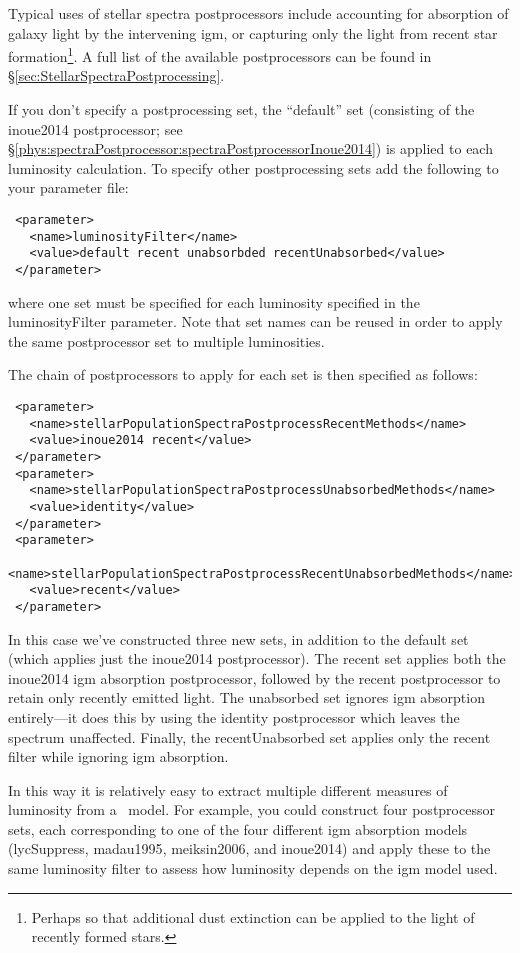 Typical uses of stellar spectra postprocessors include accounting for absorption of galaxy light by the intervening \gls{igm}, or capturing only the light from recent star formation\footnote{Perhaps so that additional dust extinction can be applied to the light of recently formed stars.}. A full list of the available postprocessors can be found in \S\ref{sec:StellarSpectraPostprocessing}.

If you don't specify a postprocessing set, the ``default'' set (consisting of the {\normalfont \ttfamily inoue2014} postprocessor; see \S\ref{phys:spectraPostprocessor:spectraPostprocessorInoue2014}) is applied to each luminosity calculation. To specify other postprocessing sets add the following to your parameter file:
\begin{verbatim}
 <parameter>
   <name>luminosityFilter</name>
   <value>default recent unabsorbded recentUnabsorbed</value>
 </parameter>
\end{verbatim}
where one set must be specified for each luminosity specified in the {\normalfont \ttfamily luminosityFilter} parameter. Note that set names can be reused in order to apply the same postprocessor set to multiple luminosities.

The chain of postprocessors to apply for each set is then specified as follows:
\begin{verbatim}
 <parameter>
   <name>stellarPopulationSpectraPostprocessRecentMethods</name>
   <value>inoue2014 recent</value>
 </parameter>
 <parameter>
   <name>stellarPopulationSpectraPostprocessUnabsorbedMethods</name>
   <value>identity</value>
 </parameter>
 <parameter>
   <name>stellarPopulationSpectraPostprocessRecentUnabsorbedMethods</name>
   <value>recent</value>
 </parameter>
\end{verbatim}
In this case we've constructed three new sets, in addition to the default set (which applies just the {\normalfont \ttfamily inoue2014} postprocessor). The {\normalfont \ttfamily recent} set applies both the {\normalfont \ttfamily inoue2014} \gls{igm} absorption postprocessor, followed by the {\normalfont \ttfamily recent} postprocessor to retain only recently emitted light. The {\normalfont \ttfamily unabsorbed} set ignores \gls{igm} absorption entirely---it does this by using the {\normalfont \ttfamily identity} postprocessor which leaves the spectrum unaffected. Finally, the {\normalfont \ttfamily recentUnabsorbed} set applies only the {\normalfont \ttfamily recent} filter while ignoring \gls{igm} absorption.

In this way it is relatively easy to extract multiple different measures of luminosity from a \glc\ model. For example, you could construct four postprocessor sets, each corresponding to one of the four different \gls{igm} absorption models ({\normalfont \ttfamily lycSuppress}, {\normalfont \ttfamily madau1995}, {\normalfont \ttfamily meiksin2006}, and {\normalfont \ttfamily inoue2014}) and apply these to the same luminosity filter to assess how luminosity depends on the \gls{igm} model used.

